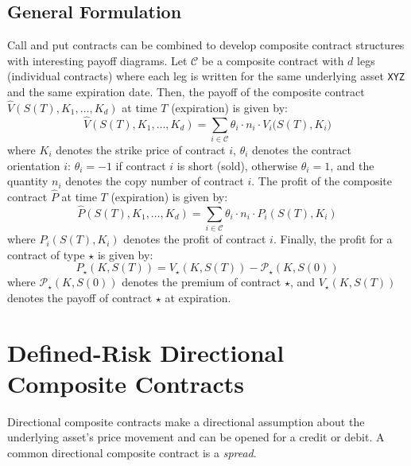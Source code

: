 \documentclass[11pt]{article}
\theoremstyle{definition}
\begin{document}
\subsection*{General Formulation}
Call and put contracts can be combined to develop composite contract structures with interesting payoff diagrams. Let $\mathcal{C}$ be a composite contract with $d$ legs (individual contracts) where each leg is written for the same underlying asset \texttt{XYZ} and the same expiration date. 
Then, the payoff of the composite contract $\hat{V}(S(T),K_{1},\dots,K_{d})$ at time $T$ (expiration) is given by:
\begin{equation}
\hat{V}(S(T),K_{1},\dots,K_{d}) = \sum_{i\in\mathcal{C}}\theta_{i}\cdot{n_{i}}\cdot{V_{i}(S(T),K_{i}})
\end{equation}
where $K_{i}$ denotes the strike price of contract $i$, $\theta_{i}$ denotes the contract orientation $i$: $\theta_{i}=-1$ if contract $i$ is short (sold), 
otherwise $\theta_{i}=1$, and the quantity $n_{i}$ denotes the copy number of contract $i$.
The profit of the composite contract $\hat{P}$ at time $T$ (expiration) is given by:
\begin{equation}
\hat{P}(S(T),K_{1},\dots,K_{d}) = \sum_{i\in\mathcal{C}}\theta_{i}\cdot{n}_{i}\cdot{P}_{i}(S(T),K_{i})
\end{equation}
where $P_{i}(S(T),K_{i})$ denotes the profit of contract $i$. 
Finally, the profit for a contract of type $\star$ is given by:
\begin{equation}
P_{\star}(K,S(T)) = {V}_{\star}(K,S(T)) -  \mathcal{P}_{\star}(K,S(0))
\end{equation}
where $\mathcal{P}_{\star}(K,S(0))$ denotes the premium of contract $\star$, and ${V}_{\star}(K,S(T))$ 
denotes the payoff of contract $\star$ at expiration.

\section*{Defined-Risk Directional Composite Contracts}
Directional composite contracts make a directional assumption about the underlying asset's price movement and can be opened for a credit or debit.
A common directional composite contract is a \textit{spread}.
\end{document}
